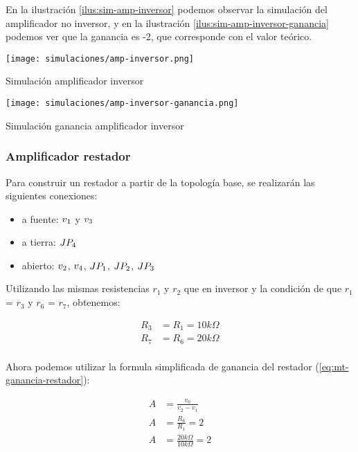 En la ilustración \ref{ilus:sim-amp-inversor} podemos observar la simulación del amplificador no inversor, y en la ilustración \ref{ilus:sim-amp-inversor-ganancia} podemos ver que la ganancia es -2, que corresponde con el valor teórico.

\begin{ilustracion}[ht]
    \centering
    \texttt{[image: simulaciones/amp-inversor.png]}
    \caption{Simulación amplificador inversor}
    \label{ilus:sim-amp-inversor}
\end{ilustracion}

\begin{ilustracion}[ht]
    \centering
    \texttt{[image: simulaciones/amp-inversor-ganancia.png]}
    \caption{Simulación ganancia amplificador inversor}
    \label{ilus:sim-amp-inversor-ganancia}
\end{ilustracion}

\subsubsection{Amplificador restador}

Para construir un restador a partir de la topología base, se realizarán las siguientes conexiones:

\begin{itemize}
    \item a fuente: $\volt{1}$ y $\volt{3}$
    \item a tierra: $\jumper{4}$
    \item abierto: $\volt{2}$, $\volt{4}$, $\jumper{1}$, $\jumper{2}$, $\jumper{3}$
\end{itemize}

\newcommand{\res}[1]{$r_{#1}$}

Utilizando las mismas resistencias \res{1} y \res{2} que en inversor  y la condición de que \res{1} = \res{3} y \res{6} = \res{7}, obtenemos:  

\begin{align*}
    R_3 &= R_1 = 10k\Omega \\
    R_7 &= R_6 = 20k\Omega \\
\end{align*}

Ahora podemos utilizar la formula simplificada de ganancia del restador (\ref{eq:mt-ganancia-restador}):


\begin{align*}
    A &= \frac{v_0}{v_2 - v_1} \\
    A & = \frac{R_6}{R_1} = 2 \\
    A &= \frac{20k\Omega}{10k\Omega} = 2
\end{align*}


